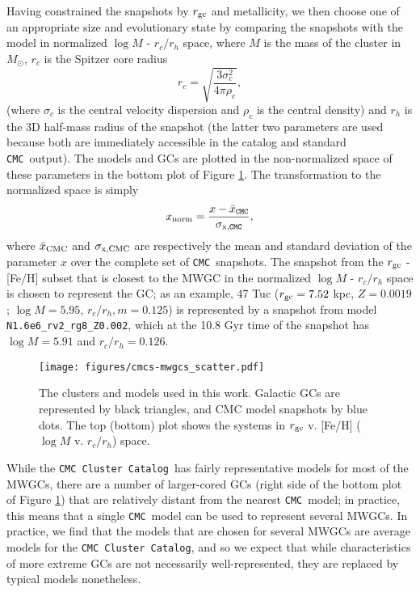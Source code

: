 \documentclass[twocolumn]{aastex631}
\newcommand{\CMC}{\texttt{CMC}}
\newcommand{\CMCcat}{\texttt{CMC Cluster Catalog}}
\begin{document}
Having constrained the snapshots by $r_{\rm gc}$ and metallicity, we then choose one of an appropriate size and evolutionary state by comparing the snapshots with the model in normalized $\log M$ - $r_c / r_h$ space, where $M$ is the mass of the cluster in $M_\odot$, $r_c$ is the Spitzer core radius \citep{1987degc.book.....S}
\begin{equation}
    r_c = \sqrt{\frac{3 \sigma_c^2}{4 \pi \rho_c}},
\end{equation}
(where $\sigma_c$ is the central velocity dispersion and $\rho_c$ is the central density) and $r_h$ is the 3D half-mass radius of the snapshot (the latter two parameters are used because both are immediately accessible in the \citet{2018MNRAS.478.1520B} catalog and standard \CMC\ output).
The models and GCs are plotted in the non-normalized space of these parameters in the bottom plot of Figure \ref{fig:cmcs-mwgcs_scatter}.
The transformation to the normalized space is simply
\begin{equation}
    x_{\rm norm} = \frac{x - \bar{x}_{\rm \CMC}}{\sigma_{\rm x, \CMC}},
\end{equation}
where $\bar{x}_{\rm CMC}$ and $\sigma_{\rm x,CMC}$ are respectively the mean and standard deviation of the parameter $x$ over the complete set of \CMC\ snapshots.
The snapshot from the $r_{\rm gc}$ - [Fe/H] subset that is closest to the MWGC in the normalized $\log M$ - $r_c / r_h$ space is chosen to represent the GC; as an example, 47 Tuc ($r_{\rm gc} = 7.52$ kpc, $Z = 0.0019$; $\log M = 5.95$, $r_c / r_h,m = 0.125$) is represented by a snapshot from model \texttt{N1.6e6\_rv2\_rg8\_Z0.002}, which at the 10.8 Gyr time of the snapshot has $\log M = 5.91$ and $r_c / r_h = 0.126$.

\begin{figure}
    \begin{centering}
        \texttt{[image: figures/cmcs-mwgcs\_scatter.pdf]}
        \caption{
        The clusters and models used in this work.
        Galactic GCs are represented by black triangles, and CMC model snapshots by blue dots.
        The top (bottom) plot shows the systems in $r_{\rm gc}$ v. [Fe/H] ($\log M$ v. $r_c / r_h$) space.
        }
        \label{fig:cmcs-mwgcs_scatter}
    \end{centering}
\end{figure}

While the \CMCcat\ has fairly representative models for most of the MWGCs, there are a number of larger-cored GCs (right side of the bottom plot of Figure \ref{fig:cmcs-mwgcs_scatter}) that are relatively distant from the nearest \CMC\ model; in practice, this means that a single \CMC\ model can be used to represent several MWGCs.
In practice, we find that the models that are chosen for several MWGCs are average models for the \CMCcat, and so we expect that while characteristics of more extreme GCs are not necessarily well-represented, they are replaced by typical models nonetheless.
\end{document}
